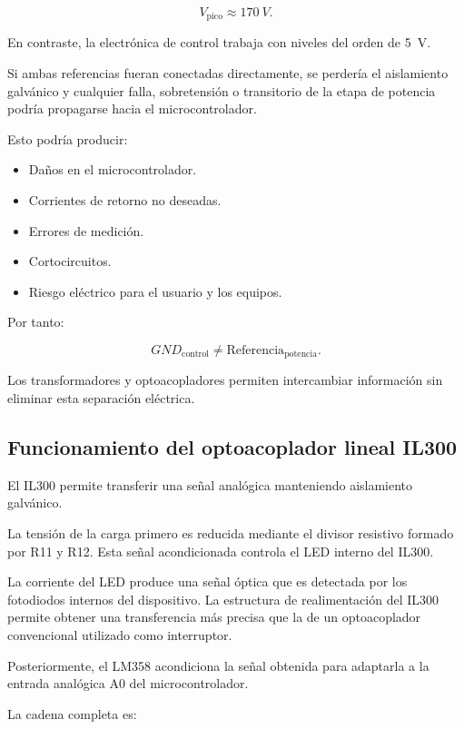 \documentclass[12pt]{article}
\begin{document}
\[
V_{\mathrm{pico}}\approx\SI{170}{V}.
\]

En contraste, la electrónica de control trabaja con niveles del orden de
\SI{5}{V}.

Si ambas referencias fueran conectadas directamente, se perdería el
aislamiento galvánico y cualquier falla, sobretensión o transitorio de la
etapa de potencia podría propagarse hacia el microcontrolador.

Esto podría producir:

\begin{itemize}
    \item Daños en el microcontrolador.
    \item Corrientes de retorno no deseadas.
    \item Errores de medición.
    \item Cortocircuitos.
    \item Riesgo eléctrico para el usuario y los equipos.
\end{itemize}

Por tanto:

\begin{equation}
GND_{\mathrm{control}}
\neq
\text{Referencia}_{\mathrm{potencia}}.
\end{equation}

Los transformadores y optoacopladores permiten intercambiar información
sin eliminar esta separación eléctrica.

\subsection{Funcionamiento del optoacoplador lineal IL300}

El IL300 permite transferir una señal analógica manteniendo aislamiento
galvánico.

La tensión de la carga primero es reducida mediante el divisor resistivo
formado por R11 y R12. Esta señal acondicionada controla el LED interno del
IL300.

La corriente del LED produce una señal óptica que es detectada por los
fotodiodos internos del dispositivo. La estructura de realimentación del
IL300 permite obtener una transferencia más precisa que la de un
optoacoplador convencional utilizado como interruptor.

Posteriormente, el LM358 acondiciona la señal obtenida para adaptarla a la
entrada analógica A0 del microcontrolador.

La cadena completa es:
\end{document}

